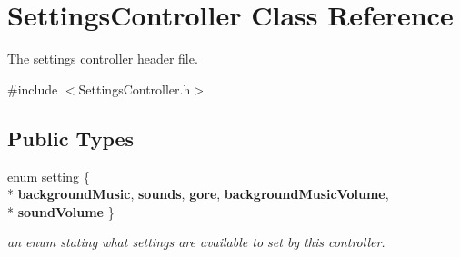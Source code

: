 \hypertarget{class_settings_controller}{\section{Settings\+Controller Class Reference}
\label{class_settings_controller}
}


The settings controller header file.  




{\ttfamily \#include $<$Settings\+Controller.\+h$>$}

\subsection*{Public Types}
\begin{DoxyCompactItemize}
\item 
\hypertarget{class_settings_controller_a757d865f9b5d8fa3f4d96048d698e03c}{enum \hyperlink{class_settings_controller_a757d865f9b5d8fa3f4d96048d698e03c}{setting} \{ \\*
{\bfseries background\+Music}, 
{\bfseries sounds}, 
{\bfseries gore}, 
{\bfseries background\+Music\+Volume}, 
\\*
{\bfseries sound\+Volume}
 \}}\label{class_settings_controller_a757d865f9b5d8fa3f4d96048d698e03c}

\begin{DoxyCompactList}\small\item\em an enum stating what settings are available to set by this controller. \end{DoxyCompactList}\end{DoxyCompactItemize}
